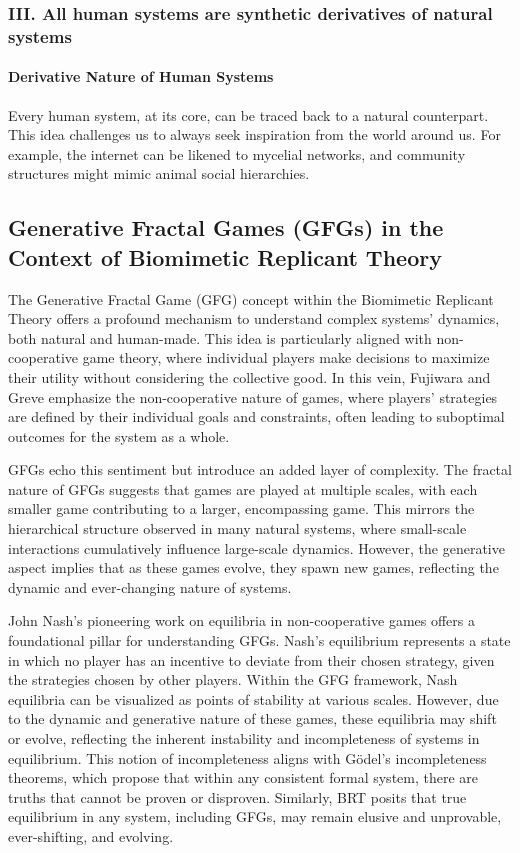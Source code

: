 \documentclass[sn-nature]{sn-jnl}%
\theoremstyle{thmstyleone}%
\theoremstyle{thmstyletwo}%
\theoremstyle{thmstylethree}%
\begin{document}
\subsubsection*{III. All human systems are synthetic derivatives of natural systems}
\paragraph{Derivative Nature of Human Systems}
Every human system, at its core, can be traced back to a natural counterpart. This idea challenges us to always seek inspiration from the world around us\cite{odum_ecological_1994}.
For example, the internet can be likened to mycelial networks, and community structures might mimic animal social hierarchies.


\subsection{Generative Fractal Games (GFGs) in the Context of Biomimetic Replicant Theory}
The Generative Fractal Game (GFG) concept within the Biomimetic Replicant Theory offers a profound mechanism to understand complex systems' dynamics, both natural and human-made. This idea is particularly aligned with non-cooperative game theory, where individual players make decisions to maximize their utility without considering the collective good. In this vein, Fujiwara and Greve\cite{fujiwara-greve_non-cooperative_2015} emphasize the non-cooperative nature of games, where players' strategies are defined by their individual goals and constraints, often leading to suboptimal outcomes for the system as a whole.

GFGs echo this sentiment but introduce an added layer of complexity. The fractal nature of GFGs suggests that games are played at multiple scales, with each smaller game contributing to a larger, encompassing game. This mirrors the hierarchical structure observed in many natural systems, where small-scale interactions cumulatively influence large-scale dynamics. However, the generative aspect implies that as these games evolve, they spawn new games, reflecting the dynamic and ever-changing nature of systems\cite{noble_biological_2019}.

John Nash's pioneering work on equilibria in non-cooperative games offers a foundational pillar for understanding GFGs\cite{arsenyan_modeling_2015}. Nash's equilibrium\cite{nash_equilibrium_1950} represents a state in which no player has an incentive to deviate from their chosen strategy, given the strategies chosen by other players. Within the GFG framework, Nash equilibria can be visualized as points of stability at various scales. However, due to the dynamic and generative nature of these games, these equilibria may shift or evolve, reflecting the inherent instability and incompleteness of systems in equilibrium. This notion of incompleteness aligns with Gödel's incompleteness theorems, which propose that within any consistent formal system, there are truths that cannot be proven or disproven\cite{zalta_gos_2020}. Similarly, BRT posits that true equilibrium in any system, including GFGs, may remain elusive and unprovable, ever-shifting, and evolving.
\end{document}
